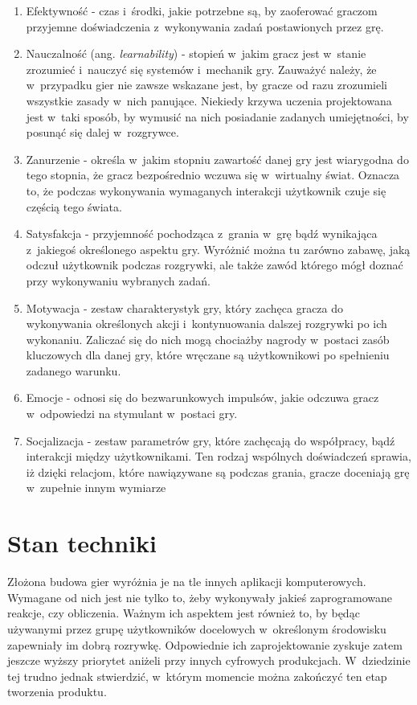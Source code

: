 \documentclass[a4paper,12pt,numbers=noenddot]{report}
\begin{document}
\begin{enumerate}
\item Efektywność - czas i~środki, jakie potrzebne są, by zaoferować graczom przyjemne doświadczenia z~wykonywania zadań postawionych przez grę.
\item Nauczalność (ang. \textit{learnability}) - stopień w~jakim gracz jest w~stanie zrozumieć i~nauczyć się systemów i~mechanik gry. Zauważyć należy, że w~przypadku gier nie zawsze wskazane jest, by gracze od razu zrozumieli wszystkie zasady w~nich panujące. Niekiedy krzywa uczenia projektowana jest w~taki sposób, by wymusić na nich posiadanie zadanych umiejętności, by posunąć się dalej w~rozgrywce.
\item Zanurzenie - określa w~jakim stopniu zawartość danej gry jest wiarygodna do tego stopnia, że gracz bezpośrednio wczuwa się w~wirtualny świat. Oznacza to, że podczas wykonywania wymaganych interakcji użytkownik czuje się częścią tego świata.
\item Satysfakcja - przyjemność pochodząca z~grania w~grę bądź wynikająca z~jakiegoś określonego aspektu gry. Wyróżnić można tu zarówno zabawę, jaką odczuł użytkownik podczas rozgrywki, ale także zawód którego mógł doznać przy wykonywaniu wybranych zadań.
\item Motywacja - zestaw charakterystyk gry, który zachęca gracza do wykonywania określonych akcji i~kontynuowania dalszej rozgrywki po ich wykonaniu. Zaliczać się do nich mogą chociażby nagrody w~postaci zasób kluczowych dla danej gry, które wręczane są użytkownikowi po spełnieniu zadanego warunku.
\item Emocje - odnosi się do bezwarunkowych impulsów, jakie odczuwa gracz w~odpowiedzi na stymulant w~postaci gry.
\item Socjalizacja - zestaw parametrów gry, które zachęcają do współpracy, bądź interakcji między użytkownikami. Ten rodzaj wspólnych doświadczeń sprawia, iż dzięki relacjom, które nawiązywane są podczas grania, gracze doceniają grę w~zupełnie innym wymiarze 
\end{enumerate}


\chapter{Stan techniki}
Złożona budowa gier wyróżnia je na tle innych aplikacji komputerowych. Wymagane od nich jest nie tylko to, żeby wykonywały jakieś zaprogramowane reakcje, czy obliczenia. Ważnym ich aspektem jest również to, by będąc używanymi przez grupę użytkowników docelowych w~określonym środowisku zapewniały im dobrą rozrywkę. Odpowiednie ich zaprojektowanie zyskuje zatem jeszcze wyższy priorytet aniżeli przy innych cyfrowych produkcjach. W~dziedzinie tej trudno jednak stwierdzić, w~którym momencie można zakończyć ten etap tworzenia produktu. 
\end{document}
